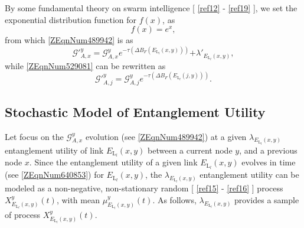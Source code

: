 \documentclass[11pt]{article}%
\newcommand*{\cref}[1]{%
  \begingroup
    \hypersetup{
      linkcolor=linkequation,
      linkbordercolor=linkequation,
    }%
    \ref{#1}%
  \endgroup
}
\begin{document}
 By some fundamental theory on swarm intelligence [\cref{ref12}-\cref{ref19}], we set the exponential distribution function for $f\left(x\right)$, as 
\begin{equation} \label{7)} 
f\left(x\right)\mathrm{=}e^x,                                                                                          
\end{equation} 
from which \eqref{ZEqnNum489942} is as
\begin{equation} \label{ZEqnNum270243} 
{\mathcal{G}}'^y_{A,x}\mathrm{=}{\mathcal{G}}^y_{A,x}e^{\mathrm{-}\tau \left(\mathit{\Delta}B_F\left(E_{{\mathrm{L}}_l}\left(x,y\right)\right)\right)}\mathrm{+}{\lambda }'_{E_{{\mathrm{L}}_l}\left(x,y\right)},                                                                    
\end{equation} 
while \eqref{ZEqnNum529081} can be rewritten as
\begin{equation} \label{9)} 
{\mathcal{G}}'^y_{A,j}\mathrm{=}{\mathcal{G}}^y_{A,j}e^{\mathrm{-}\tau \left(\mathit{\Delta}B_F\left(E_{{\mathrm{L}}_l}\left(j,y\right)\right)\right)}.                                                                              
\end{equation} 
 
\subsection{Stochastic Model of Entanglement Utility }
Let focus on the ${\mathcal{G}}^y_{A,x}$ evolution (see \eqref{ZEqnNum489942}) at a given ${\lambda }_{E_{{\mathrm{L}}_l}\left(x,y\right)}$ entanglement utility of link $E_{{\mathrm{L}}_l}\left(x,y\right)$ between a current node $y$, and a previous node $x$. Since the entanglement utility of a given link $E_{{\mathrm{L}}_l}\left(x,y\right)$ evolves in time (see \eqref{ZEqnNum640853}) for $E_{{\mathrm{L}}_l}\left(x,y\right)$, the ${\lambda }_{E_{{\mathrm{L}}_l}\left(x,y\right)}$ entanglement utility can be modeled as a non-negative, non-stationary random [\cref{ref15}-\cref{ref16}] process $X^y_{E_{{\mathrm{L}}_l}\left(x,y\right)}\left(t\right)$, with mean ${\mu }^y_{E_{{\mathrm{L}}_l}\left(x,y\right)}\left(t\right)$. As follows, ${\lambda }_{E_{{\mathrm{L}}_l}\left(x,y\right)}$ provides a sample of process $X^y_{E_{{\mathrm{L}}_l}\left(x,y\right)}\left(t\right)$.
\end{document}
